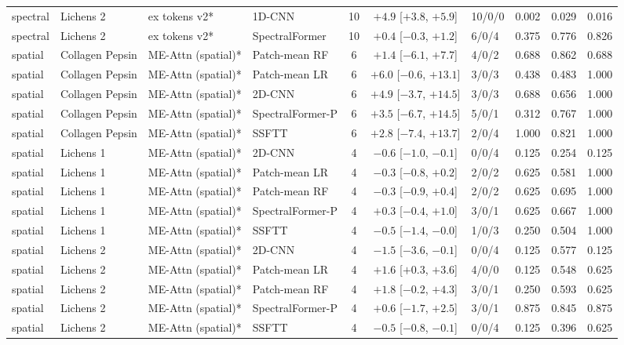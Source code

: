 \begin{tabular}{llllcclccc}
spectral & Lichens 2 & ex tokens v2* & 1D-CNN & 10 & $+4.9$ [$+3.8$, $+5.9$] & 10/0/0 & 0.002 & 0.029 & 0.016 \\
spectral & Lichens 2 & ex tokens v2* & SpectralFormer & 10 & $+0.4$ [$-0.3$, $+1.2$] & 6/0/4 & 0.375 & 0.776 & 0.826 \\
\midrule
spatial & Collagen Pepsin & ME-Attn (spatial)* & Patch-mean RF & 6 & $+1.4$ [$-6.1$, $+7.7$] & 4/0/2 & 0.688 & 0.862 & 0.688 \\
spatial & Collagen Pepsin & ME-Attn (spatial)* & Patch-mean LR & 6 & $+6.0$ [$-0.6$, $+13.1$] & 3/0/3 & 0.438 & 0.483 & 1.000 \\
spatial & Collagen Pepsin & ME-Attn (spatial)* & 2D-CNN & 6 & $+4.9$ [$-3.7$, $+14.5$] & 3/0/3 & 0.688 & 0.656 & 1.000 \\
spatial & Collagen Pepsin & ME-Attn (spatial)* & SpectralFormer-P & 6 & $+3.5$ [$-6.7$, $+14.5$] & 5/0/1 & 0.312 & 0.767 & 1.000 \\
spatial & Collagen Pepsin & ME-Attn (spatial)* & SSFTT & 6 & $+2.8$ [$-7.4$, $+13.7$] & 2/0/4 & 1.000 & 0.821 & 1.000 \\
\midrule
spatial & Lichens 1 & ME-Attn (spatial)* & 2D-CNN & 4 & $-0.6$ [$-1.0$, $-0.1$] & 0/0/4 & 0.125 & 0.254 & 0.125 \\
spatial & Lichens 1 & ME-Attn (spatial)* & Patch-mean LR & 4 & $-0.3$ [$-0.8$, $+0.2$] & 2/0/2 & 0.625 & 0.581 & 1.000 \\
spatial & Lichens 1 & ME-Attn (spatial)* & Patch-mean RF & 4 & $-0.3$ [$-0.9$, $+0.4$] & 2/0/2 & 0.625 & 0.695 & 1.000 \\
spatial & Lichens 1 & ME-Attn (spatial)* & SpectralFormer-P & 4 & $+0.3$ [$-0.4$, $+1.0$] & 3/0/1 & 0.625 & 0.667 & 1.000 \\
spatial & Lichens 1 & ME-Attn (spatial)* & SSFTT & 4 & $-0.5$ [$-1.4$, $-0.0$] & 1/0/3 & 0.250 & 0.504 & 1.000 \\
\midrule
spatial & Lichens 2 & ME-Attn (spatial)* & 2D-CNN & 4 & $-1.5$ [$-3.6$, $-0.1$] & 0/0/4 & 0.125 & 0.577 & 0.125 \\
spatial & Lichens 2 & ME-Attn (spatial)* & Patch-mean LR & 4 & $+1.6$ [$+0.3$, $+3.6$] & 4/0/0 & 0.125 & 0.548 & 0.625 \\
spatial & Lichens 2 & ME-Attn (spatial)* & Patch-mean RF & 4 & $+1.8$ [$-0.2$, $+4.3$] & 3/0/1 & 0.250 & 0.593 & 0.625 \\
spatial & Lichens 2 & ME-Attn (spatial)* & SpectralFormer-P & 4 & $+0.6$ [$-1.7$, $+2.5$] & 3/0/1 & 0.875 & 0.845 & 0.875 \\
spatial & Lichens 2 & ME-Attn (spatial)* & SSFTT & 4 & $-0.5$ [$-0.8$, $-0.1$] & 0/0/4 & 0.125 & 0.396 & 0.625 \\
\bottomrule
\end{tabular}
